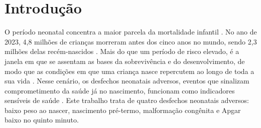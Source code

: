 
\section{Introdução}\label{sec:introducao}

O período neonatal concentra a maior parcela da mortalidade infantil \cite{unigme2024}. 
No ano de 2023, 4,8 milhões de crianças morreram antes dos cinco anos no mundo, sendo 2,3 milhões delas recém-nascidos \cite{unigme2024}. 
Mais do que um período de risco elevado, é a janela em que se assentam as bases da sobrevivência e do desenvolvimento, de modo que as condições em que uma criança nasce repercutem ao longo de toda a sua vida \cite{lawn2014}. Nesse cenário, os desfechos neonatais adversos, eventos que sinalizam comprometimento da saúde já no nascimento, funcionam como indicadores sensíveis de saúde \cite{lawn2014}.
Este trabalho trata de quatro desfechos neonatais adversos: baixo peso ao nascer, nascimento pré-termo, malformação congênita e Apgar baixo no quinto minuto.


 







